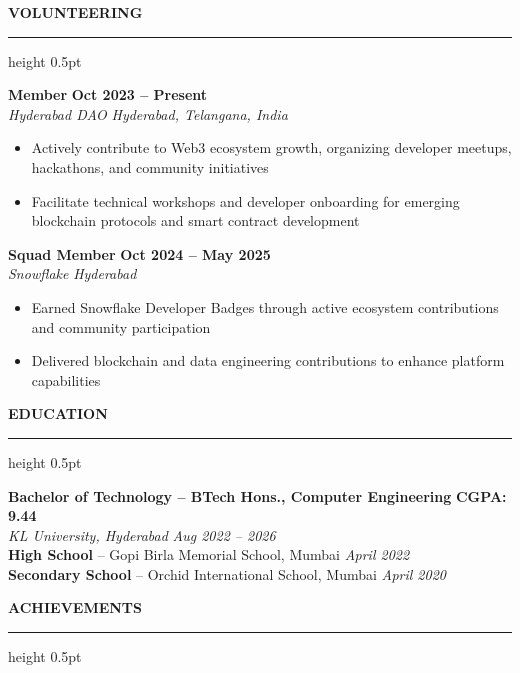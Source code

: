 \documentclass[11pt,a4paper]{article}
\newcommand{\cvsection}[1]{%
  \vspace{7pt}%
  {\large\textbf{\MakeUppercase{#1}}}%
  \vspace{2pt}%
  \hrule height 0.5pt%
  \vspace{4pt}%
}
\begin{document}
\cvsection{Volunteering}

\noindent \textbf{Member} \hfill \textbf{Oct 2023 -- Present} \\
\textit{Hyderabad DAO} \hfill \textit{Hyderabad, Telangana, India}
\begin{itemize}[leftmargin=1.5em, itemsep=1pt, parsep=0pt, topsep=1.5pt]
  \item Actively contribute to Web3 ecosystem growth, organizing developer meetups, hackathons, and community initiatives
  \item Facilitate technical workshops and developer onboarding for emerging blockchain protocols and smart contract development
\end{itemize}
\vspace{2.5pt}

\noindent \textbf{Squad Member} \hfill \textbf{Oct 2024 -- May 2025} \\
\textit{Snowflake} \hfill \textit{Hyderabad}
\begin{itemize}[leftmargin=1.5em, itemsep=1pt, parsep=0pt, topsep=1.5pt]
  \item Earned Snowflake Developer Badges through active ecosystem contributions and community participation
  \item Delivered blockchain and data engineering contributions to enhance platform capabilities
\end{itemize}

\newpage
\cvsection{Education}

\noindent \textbf{Bachelor of Technology -- BTech Hons., Computer Engineering} \hfill \textbf{CGPA: 9.44} \\
\textit{KL University, Hyderabad} \hfill \textit{Aug 2022 -- 2026} \\[4pt]
\noindent \textbf{High School} -- Gopi Birla Memorial School, Mumbai \hfill \textit{April 2022} \\[2pt]
\noindent \textbf{Secondary School} -- Orchid International School, Mumbai \hfill \textit{April 2020}

\cvsection{Achievements}
\end{document}
